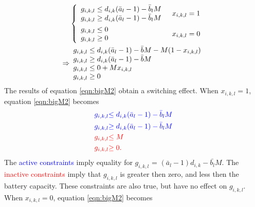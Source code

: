 \begin{equation}\label{eqn:bigM2}
 \begin{aligned} 
	 &\begin{dcases} 
		\begin{array}{l}
		g_{i,k,l} \le d_{i,k}(\bar{a}_l - 1) - \bar{b}_lM\\
		g_{i,k,l} \ge d_{i,k}(\bar{a}_l - 1) - \bar{b}_lM\\
		\end{array}
		& x_{i,k,l} = 1 \\
		\begin{array}{l}
		g_{i,k,l} \le 0 \\
		g_{i,k,l} \ge 0 \\
		\end{array} & x_{i,k,l} = 0\\ 
	\end{dcases} \\
	\Rightarrow & 
	 \begin{array}{l}
		 g_{i,k,l} \le d_{i,k}(\bar{a}_l - 1) - \bar{b}M - M(1 - x_{i,k,l})\\
		 g_{i,k,l} \ge d_{i,k}(\bar{a}_l - 1) - \bar{b}M\\
		 g_{i,k,l} \le 0 + Mx_{i,k,l} \\
		 g_{i,k,l} \ge 0 \\
	 \end{array}
\end{aligned}
\end{equation}
The results of equation \ref{eqn:bigM2} obtain a switching effect.  When $x_{i,k,l} = 1$, equation \ref{eqn:bigM2} becomes 
\begin{equation}
	\begin{aligned}
		\color{blue}{g_{i,k,l}}  &\color{blue}{\le d_{i,k}(\bar{a}_l - 1) - \bar{b}_lM} \\
		\color{blue}{g_{i,k,l}}  &\color{blue}{\ge d_{i,k}(\bar{a}_l - 1) - \bar{b}_lM} \\
		\color{red}{g_{i,k,l}} & \color{red}{\le M} \\
		\color{red}{g_{i,k,l}} & \color{red}{\ge 0}.  
	\end{aligned}
\end{equation}
The \textcolor{blue}{active constraints} imply equality for $g_{i,k,l}$ = $(\bar{a}_l - 1)d_{i,k} - \bar{b_l}M$.  The \textcolor{red}{inactive constraints} imply that $g_{i,k,l}$ is greater then zero, and less then the battery capacity.  These constraints are also true, but have no effect on $g_{i,k,l}$. When $x_{i,k,l} = 0$, equation \ref{eqn:bigM2} becomes
